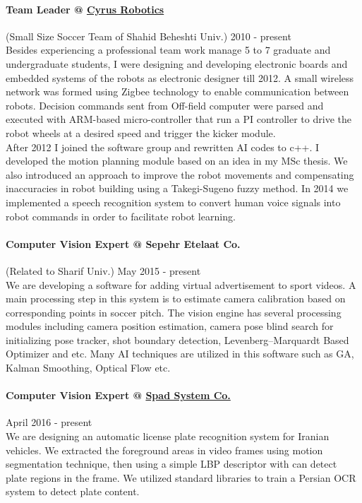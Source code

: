 \documentclass[10pt]{res}
\begin{document}
\begin{resume}
\paragraph{Team Leader @ \href{http://robocup.sbu.ac.ir}{Cyrus Robotics}}(Small Size Soccer Team of Shahid Beheshti Univ.) \hfill 2010 - present\\
Besides experiencing a professional team work manage 5 to 7 graduate and undergraduate students, I were designing and developing electronic boards and embedded systems of the robots as electronic designer till 2012. A small wireless network was formed using Zigbee technology to enable communication between robots. Decision commands sent from Off-field computer were parsed and executed with ARM-based micro-controller that run a PI controller to  drive the robot wheels at a desired speed and trigger the kicker module.\\
After 2012 I joined the software group and rewritten AI codes to c++. I developed the motion planning module based on an idea in my MSc thesis. We also introduced an approach to improve the robot movements and compensating inaccuracies in robot building using a Takegi-Sugeno fuzzy method.
In 2014 we implemented a speech recognition system to convert human voice signals into robot commands in order to facilitate robot learning.

\paragraph{Computer Vision Expert @ Sepehr Etelaat Co.} (Related to Sharif Univ.) \hfill May 2015 - present\\
We are developing a software for adding virtual advertisement to sport videos. A main processing step in this system is to estimate camera calibration based on corresponding points in soccer pitch. The vision engine has several processing modules including camera position estimation, camera pose blind search for initializing pose tracker, shot boundary detection, Levenberg–Marquardt Based Optimizer and etc. Many AI techniques are utilized in this software such as GA, Kalman Smoothing, Optical Flow etc.

\paragraph{Computer Vision Expert @ \href{http://www.spadsystem.com/}{Spad System Co.} } \hfill April 2016 - present\\
We are designing an automatic license plate recognition system for Iranian vehicles. We extracted the foreground areas in video frames using motion segmentation technique, then using a simple LBP descriptor with can detect plate regions in the frame. We utilized standard libraries to train a Persian OCR system to detect plate content.



\end{resume}
\end{document}
